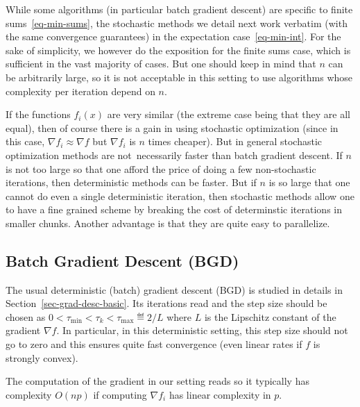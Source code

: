 While some algorithms (in particular batch gradient descent) are specific to finite sums~\eqref{eq-min-sums}, the stochastic methods we detail next work verbatim (with the same convergence guarantees) in the expectation case~\eqref{eq-min-int}. For the sake of simplicity, we however do the exposition for the finite sums case, which is sufficient in the vast majority of cases. But one should keep in mind that $n$ can be arbitrarily large, so it is not acceptable in this setting to use algorithms whose complexity per iteration depend on $n$.

If the functions $f_i(x)$ are very similar (the extreme case being that they are all equal), then of course there is a gain in using stochastic optimization (since in this case, $\nabla f_i \approx \nabla f$ but $\nabla f_i$ is $n$ times cheaper).
%
But in general stochastic optimization methods are not necessarily faster than batch gradient descent. 
%
If $n$ is not too large so that one afford the price of doing a few non-stochastic iterations, then deterministic methods can be faster.
%
But if $n$ is so large that one cannot do even a single deterministic iteration, then stochastic methods allow one to have a fine grained scheme by breaking the cost of determinstic iterations in smaller chunks. Another advantage is that they are quite easy to parallelize. 


\subsection{Batch Gradient Descent (BGD)}

The usual deterministic (batch) gradient descent (BGD) is studied in details in Section~\ref{sec-grad-desc-basic}. Its iterations read
and the step size should be chosen as $0 < \tau_{\min} < \tau_k < \tau_{\max} \eqdef 2/L$ where $L$ is the Lipschitz constant of the gradient $\nabla f$. In particular, in this deterministic setting, this step size should not go to zero and this ensures quite fast convergence (even linear rates if $f$ is strongly convex).

The computation of the gradient in our setting reads
so it typically has complexity $O(np)$ if computing $\nabla f_i$ has linear complexity in $p$.

